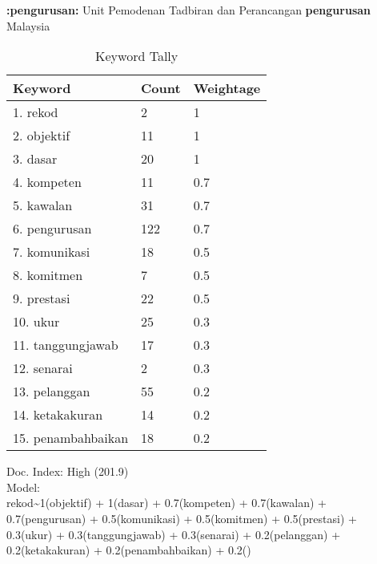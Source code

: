 \documentclass{article}
\begin{document}
\textbf{:pengurusan:} Unit Pemodenan Tadbiran dan
Perancangan \textbf{pengurusan} Malaysia
\newline
\begin{table}[]
\begin{tabular}{lll} \hline


Keyword & Count & Weightage \\ \hline
1. rekod & 2 & 1\\
2. objektif & 11 & 1\\
3. dasar & 20 & 1\\
4. kompeten & 11 & 0.7\\
5. kawalan & 31 & 0.7\\
6. pengurusan & 122 & 0.7\\
7. komunikasi & 18 & 0.5\\
8. komitmen & 7 & 0.5\\
9. prestasi & 22 & 0.5\\
10. ukur & 25 & 0.3\\
11. tanggungjawab & 17 & 0.3\\
12. senarai & 2 & 0.3\\
13. pelanggan & 55 & 0.2\\
14. ketakakuran & 14 & 0.2\\
15. penambahbaikan & 18 & 0.2\\
\end{tabular}
\caption{Keyword Tally}
\label{table:1}
\end{table}
Doc. Index: High (201.9) \\
Model: \\
rekod\hspace{5mm}\textasciitilde\hspace{5mm}1(objektif) + 1(dasar) + 0.7(kompeten) + 0.7(kawalan) + \\
\hspace{5mm}0.7(pengurusan) + 0.5(komunikasi) + 0.5(komitmen) + 0.5(prestasi) +\\
\hspace{5mm}0.3(ukur) + 0.3(tanggungjawab) + 0.3(senarai) + 0.2(pelanggan) +\\
\hspace{5mm}0.2(ketakakuran) + 0.2(penambahbaikan) + 0.2()
\end{document}
